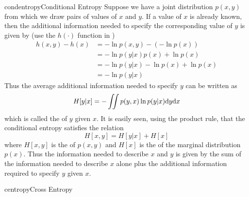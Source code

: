 \documentclass[9pt]{article}
\begin{document}
\begin{topic}{condentropy}{Conditional Entropy}
Suppose we have a joint distribution $p(x, y)$ from which we draw pairs of values of $x$ and $y$. If a value of $x$ is already known, then the additional information needed to specify the corresponding value of $y$ is given by (use the $h(\cdot)$ function in )
 \[
 \begin{split}
 h(x,y) - h(x) &= -\ln p(x,y) - (-\ln p(x))\\
&= -\ln p(y|x)p(x) + \ln p(x)\\
&= -\ln p(y|x) -\ln p(x) + \ln p(x)\\
&= -\ln p(y|x) 
 \end{split}
 \]
 Thus the average additional information needed to specify $y$ can be written as
 \[
 H[y|x] = -\iint p(y,x) \ln p(y|x) \mathrm{d} y\mathrm{d} x
 \]
which is called the \textit{\color{red}{conditional entropy}} of $y$ given $x$. It is easily seen, using the product rule, that the conditional entropy satisfies the relation
\[
H[x,y] = H[y|x] + H[x]
\]
where $H[x, y]$ is the  of $p(x, y)$ and $H[x]$ is the  of the marginal distribution $p(x)$. Thus the information needed to describe $x$ and $y$ is given by the sum of the information needed to describe $x$ alone plus the additional information required to specify $y$ given $x$.

\end{topic}

\begin{topic}{centropy}{Cross Entropy}
	
\end{topic}
\end{document}
